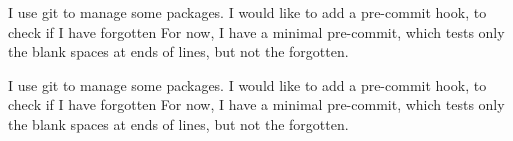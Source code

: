 \documentclass{book}
\begin{document}
\begin{pages}
\begin{Rightside}
\pstart
{}
\pend

\pstart
I use git to manage some packages.
I would like to add a pre-commit hook, to check if I have forgotten
For now, I have a minimal pre-commit, which tests only the blank spaces at ends of lines, but not the forgotten.
\pend

\pstart
{}
\pend

\pstart
I use git to manage some packages.
I would like to add a pre-commit hook, to check if I have forgotten
For now, I have a minimal pre-commit, which tests only the blank spaces at ends of lines, but not the forgotten.
\pend


\endnumbering

\end{Rightside}

\end{pages}
\Pages
\end{document}
